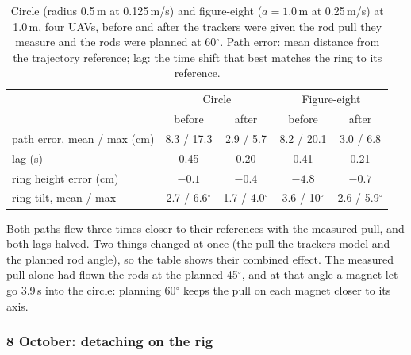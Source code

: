 \begin{table}[h]
\centering
\small
\caption{Circle (radius 0.5\,m at 0.125\,m/s) and figure-eight ($a = 1.0$\,m at 0.25\,m/s) at 1.0\,m,
four UAVs, before and after the trackers were given the rod pull they measure and the rods were planned
at 60$^\circ$. Path error: mean distance from the trajectory reference; lag: the time shift that best
matches the ring to its reference.}
\label{tab:rig_oct7}
\begin{tabularx}{\textwidth}{>{\raggedright\arraybackslash}Xcccc}
\toprule
 & \multicolumn{2}{c}{Circle} & \multicolumn{2}{c}{Figure-eight} \\
 & before & after & before & after \\
\midrule
path error, mean / max (cm) & 8.3 / 17.3 & 2.9 / 5.7 & 8.2 / 20.1 & 3.0 / 6.8 \\
lag (s) & 0.45 & 0.20 & 0.41 & 0.21 \\
ring height error (cm) & $-0.1$ & $-0.4$ & $-4.8$ & $-0.7$ \\
ring tilt, mean / max & 2.7 / 6.6$^\circ$ & 1.7 / 4.0$^\circ$ & 3.6 / 10$^\circ$ & 2.6 / 5.9$^\circ$ \\
\bottomrule
\end{tabularx}
\end{table}

Both paths flew three times closer to their references with the measured pull, and both lags halved.
Two things changed at once (the pull the trackers model and the planned rod angle), so the table shows
their combined effect. The measured pull alone had flown the rods at the planned 45$^\circ$, and at that
angle a magnet let go 3.9\,s into the circle: planning 60$^\circ$ keeps the pull on each magnet closer
to its axis.

\subsubsection{8 October: detaching on the rig}

